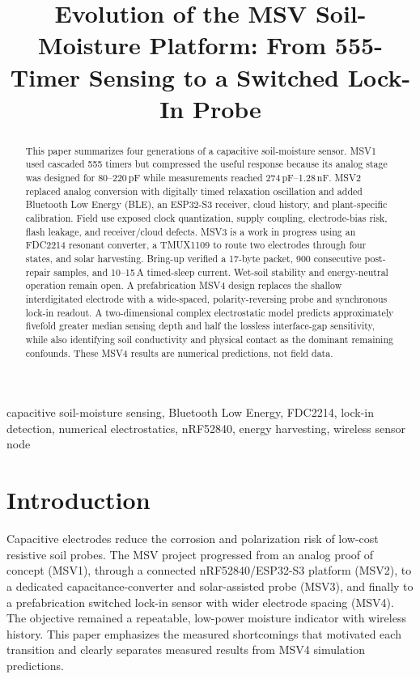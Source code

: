 \documentclass[conference]{IEEEtran}
\begin{document}
\title{Evolution of the MSV Soil-Moisture Platform: From 555-Timer Sensing to a Switched Lock-In Probe}

\author{
}

\maketitle

\begin{abstract}
This paper summarizes four generations of a capacitive soil-moisture sensor. MSV1 used cascaded
555 timers but compressed the useful response because its analog stage was designed for
80--220\,pF while measurements reached 274\,pF--1.28\,nF. MSV2 replaced analog conversion with
digitally timed relaxation oscillation and added Bluetooth Low Energy (BLE), an ESP32-S3 receiver,
cloud history, and plant-specific calibration. Field use exposed clock quantization, supply
coupling, electrode-bias risk, flash leakage, and receiver/cloud defects. MSV3 is a work in
progress using an FDC2214 resonant converter, a TMUX1109 to route two electrodes through four
states, and solar harvesting. Bring-up verified a 17-byte packet, 900 consecutive post-repair
samples, and 10--15\,\textmu A timed-sleep current. Wet-soil stability and energy-neutral operation
remain open. A prefabrication MSV4 design replaces the shallow interdigitated electrode with a
wide-spaced, polarity-reversing probe and synchronous lock-in readout. A two-dimensional complex
electrostatic model predicts approximately fivefold greater median sensing depth and half the
lossless interface-gap sensitivity, while also identifying soil conductivity and physical contact
as the dominant remaining confounds. These MSV4 results are numerical predictions, not field data.
\end{abstract}

\begin{IEEEkeywords}
capacitive soil-moisture sensing, Bluetooth Low Energy, FDC2214, lock-in detection, numerical
electrostatics, nRF52840, energy harvesting, wireless sensor node
\end{IEEEkeywords}

\section{Introduction}
Capacitive electrodes reduce the corrosion and polarization risk of low-cost resistive soil
probes. The MSV project progressed from an analog proof of concept (MSV1), through a connected
nRF52840/ESP32-S3 platform (MSV2), to a dedicated capacitance-converter and solar-assisted probe
(MSV3), and finally to a prefabrication switched lock-in sensor with wider electrode spacing
(MSV4). The objective remained a repeatable, low-power moisture indicator with wireless history.
This paper emphasizes the measured shortcomings that motivated each transition and clearly
separates measured results from MSV4 simulation predictions.
\end{document}
